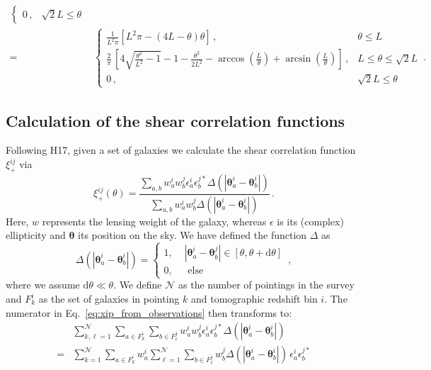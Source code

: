\documentclass{aa}
\renewcommand{\rm}{\mathrm}
\def\b#1{\bm{#1}}
\begin{document}
\begin{appendix}
\begin{align}
\begin{cases}
0\, , &\sqrt{2}L \leq\theta
\end{cases} \nonumber\\[10pt]
 = & \begin{cases}
\frac{1}{L^2 \pi}\left[L^2\pi - (4L-\theta) \theta\right]\, ,  & \theta \leq L \\[10pt]
\frac{2}{\pi}\,\left[4\sqrt{\frac{\theta^2}{L^2}-1} -1 - \frac{\theta^2}{2L^2} - \arccos\left(\frac{L}{\theta}\right) + \arcsin\left(\frac{L}{\theta}\right)\right]\, ,  & L  \leq \theta \leq \sqrt{2}L \\[10pt]
0\, ,  & \sqrt{2}L \leq \theta
\end{cases}\, .
\end{align}

\subsection{Calculation of the shear correlation functions}
\label{sec:calc of xipm}
Following H17, given a set of galaxies we calculate the shear correlation function $\xi_+^{ij}$ via \begin{equation}
\xi^{ij}_+(\theta) = \frac{\sum_{a,b}w_a^iw_b^j\epsilon_a^i\epsilon_b^{j*}\Delta(|\b\theta_a^i-\b\theta_b^i|)}{\sum_{a,b}w_a^iw_b^j\Delta(|\b\theta_a^i-\b\theta_b^i|)}\, .
\label{eq:xip_from_observations}
\end{equation}
Here, $w$ represents the lensing weight of the galaxy, whereas $\epsilon$ is its (complex) ellipticity and $\b \theta$ its position on the sky. We have defined the function $\Delta$ as \begin{equation}
\Delta(|\b\theta_a^i-\b\theta_b^i|) = \begin{cases}
1, \,\, & |\b\theta_a^i-\b\theta_b^j| \in [\theta,\theta+{\rm d}\theta] \\
0, & \text{ else}
\end{cases}\, ,
\end{equation}
where we assume ${\rm d}\theta \ll \theta$. We define $\mathcal{N}$ as the number of pointings in the survey and $F_k^i$ as the set of galaxies in pointing $k$ and tomographic redshift bin $i$. The numerator in Eq.~\eqref{eq:xip_from_observations} then transforms to: \begin{align}
& \sum_{k,\ell=1}^\mathcal{N} \sum_{a\in F_k^i}\sum_{b\in F_{\ell}^j} w_a^iw_b^j\epsilon_a^i\epsilon_b^{j*} \Delta(|\b\theta_a^i-\b\theta_b^i|) \nonumber\\
 = & \sum_{k=1}^\mathcal{N}\sum_{a\in F_k^i}w_a^i \sum_{\ell=1}^\mathcal{N} \sum_{b\in F_{\ell}^j} w_b^j \Delta(|\b\theta_a^i-\b\theta_b^i|)\, \epsilon_a^i\epsilon_b^{j*} \nonumber\\

\end{align}
\end{appendix}
\end{document}
